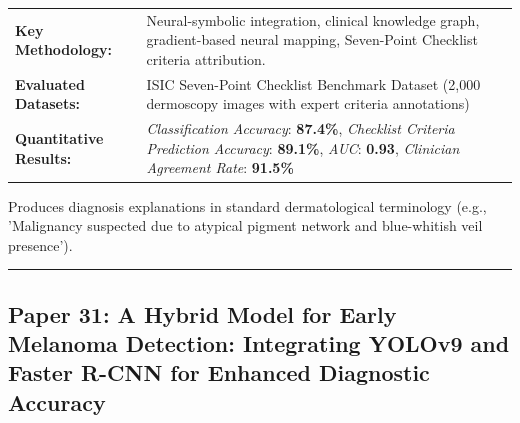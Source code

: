 \documentclass[10pt,a4paper]{article}
\begin{document}
\vspace{4pt}
\begin{tabularx}{\linewidth}{p{3.2cm}X}
\toprule
\textbf{Key Methodology:} & Neural-symbolic integration, clinical knowledge graph, gradient-based neural mapping, Seven-Point Checklist criteria attribution. \\
\textbf{Evaluated Datasets:} & ISIC Seven-Point Checklist Benchmark Dataset (2,000 dermoscopy images with expert criteria annotations) \\
\textbf{Quantitative Results:} & \textit{Classification Accuracy}: \textbf{87.4\%}, \textit{Checklist Criteria Prediction Accuracy}: \textbf{89.1\%}, \textit{AUC}: \textbf{0.93}, \textit{Clinician Agreement Rate}: \textbf{91.5\%} \\
\bottomrule
\end{tabularx}
\vspace{4pt}
\begin{tcolorbox}[utilitybox,title=Clinical Utility and Real-World Impact]
Produces diagnosis explanations in standard dermatological terminology (e.g., 'Malignancy suspected due to atypical pigment network and blue-whitish veil presence').
\end{tcolorbox}
\vspace{12pt}
\hrule
\vspace{12pt}
\subsection*{Paper 31: A Hybrid Model for Early Melanoma Detection: Integrating YOLOv9 and Faster R-CNN for Enhanced Diagnostic Accuracy}
\end{document}
